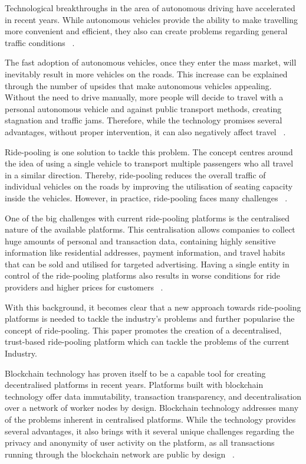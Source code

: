 Technological breakthroughs in the area of autonomous driving have accelerated in recent years.
While autonomous vehicles provide the ability to make travelling more convenient and efficient, they also can create problems regarding general traffic conditions ~\cite{Riel.2022}.

The fast adoption of autonomous vehicles, once they enter the mass market, will inevitably result in more vehicles on the roads. This increase can be explained through the number of upsides that make autonomous vehicles appealing. Without the need to drive manually, more people will decide to travel with a personal autonomous vehicle and against public transport methods, creating stagnation and traffic jams. Therefore, while the technology promises several advantages, without proper intervention, it can also negatively affect  travel ~\cite{Riel.2022}.

Ride-pooling is one solution to tackle this problem. The concept centres around the idea of using a single vehicle to transport multiple passengers who all travel in a similar direction. Thereby, ride-pooling reduces the overall traffic of individual vehicles on the roads by improving the utilisation of seating capacity inside the vehicles. However, in practice, ride-pooling faces many challenges ~\cite{Riel.2022}.

One of the big challenges with current ride-pooling platforms is the centralised nature of the available platforms. This centralisation allows companies to collect huge amounts of personal and transaction data, containing highly sensitive information like residential addresses, payment information, and travel habits that can be sold and utilised for targeted advertising. Having a single entity in control of the ride-pooling platforms also results in worse conditions for ride providers and higher prices for customers ~\cite{Badr.}. 

With this background, it becomes clear that a new approach towards ride-pooling platforms is needed to tackle the industry's problems and further popularise the concept of ride-pooling. This paper promotes the creation of a decentralised, trust-based ride-pooling platform which can tackle the problems of the current Industry.

Blockchain technology has proven itself to be a capable tool for creating decentralised platforms in recent years. Platforms built with blockchain technology offer  data immutability, transaction transparency, and decentralisation  over a network of worker nodes by design. Blockchain technology addresses many of the problems inherent in centralised platforms. While the technology provides several advantages, it also brings with it several unique challenges regarding the privacy and anonymity of user activity on the platform, as all transactions running through the blockchain network are public by design ~\cite{Mahmoud.2022}.

